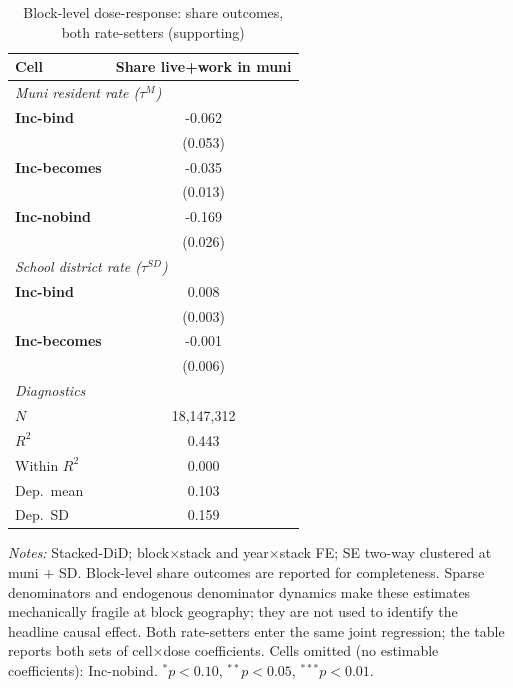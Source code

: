 \begin{table}[!htbp]
  \centering
  \caption{Block-level dose-response: share outcomes, both rate-setters (supporting)}
  \label{tab:headline_block_shares}
  \footnotesize
  \renewcommand{\arraystretch}{0.9}
  \begin{tabular}{lc}
    \toprule
    Cell & Share live+work in muni \\
    \midrule
    \multicolumn{2}{l}{\textit{Muni resident rate ($\tau^M$)}} \\
    \textbf{Inc-bind} & -0.062 \\
                      & (0.053) \\
    \textbf{Inc-becomes} & -0.035\sym{***} \\
                      & (0.013) \\
    \textbf{Inc-nobind} & -0.169\sym{***} \\
                      & (0.026) \\
    \midrule
    \multicolumn{2}{l}{\textit{School district rate ($\tau^{SD}$)}} \\
    \textbf{Inc-bind} & 0.008\sym{**} \\
                      & (0.003) \\
    \textbf{Inc-becomes} & -0.001 \\
                      & (0.006) \\
    \midrule
    \multicolumn{2}{l}{\textit{Diagnostics}} \\
    $N$           & 18,147,312 \\
    $R^2$         & 0.443 \\
    Within $R^2$  & 0.000 \\
    Dep.\ mean    & 0.103 \\
    Dep.\ SD      & 0.159 \\
    \bottomrule
  \end{tabular}
  \vspace{0.3em}
  \begin{minipage}{0.95\textwidth}
    \footnotesize \textit{Notes:} Stacked-DiD; block$\times$stack and year$\times$stack FE; SE two-way clustered at muni $+$ SD. Block-level share outcomes are reported for completeness. Sparse denominators and endogenous denominator dynamics make these estimates mechanically fragile at block geography; they are not used to identify the headline causal effect. Both rate-setters enter the same joint regression; the table reports both sets of cell$\times$dose coefficients. Cells omitted (no estimable coefficients): Inc-nobind. $^{*}p<0.10$, $^{**}p<0.05$, $^{***}p<0.01$.
  \end{minipage}
\end{table}
